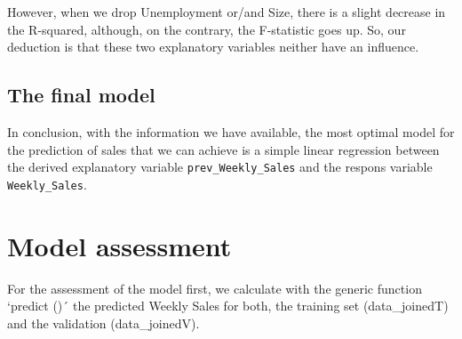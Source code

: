 \documentclass[11pt,]{article}
\newenvironment{Shaded}{\begin{snugshade}}{\end{snugshade}}
\newcommand{\KeywordTok}[1]{\textcolor[rgb]{0.13,0.29,0.53}{\textbf{{#1}}}}
\newcommand{\DataTypeTok}[1]{\textcolor[rgb]{0.13,0.29,0.53}{{#1}}}
\newcommand{\StringTok}[1]{\textcolor[rgb]{0.31,0.60,0.02}{{#1}}}
\newcommand{\CommentTok}[1]{\textcolor[rgb]{0.56,0.35,0.01}{\textit{{#1}}}}
\newcommand{\NormalTok}[1]{{#1}}
\begin{document}
However, when we drop Unemployment or/and Size, there is a slight
decrease in the R-squared, although, on the contrary, the F-statistic
goes up. So, our deduction is that these two explanatory variables
neither have an influence.

\begin{Shaded}
\end{Shaded}

\subsection{The final model}\label{the-final-model}

In conclusion, with the information we have available, the most optimal
model for the prediction of sales that we can achieve is a simple linear
regression between the derived explanatory variable
\texttt{prev\_Weekly\_Sales} and the respons variable
\texttt{Weekly\_Sales}.

\begin{Shaded}
\end{Shaded}

\section{Model assessment}\label{model-assessment}

For the assessment of the model first, we calculate with the generic
function `predict ()´ the predicted Weekly Sales for both, the training
set (data\_joinedT) and the validation (data\_joinedV).

\begin{Shaded}
\end{Shaded}
\end{document}
